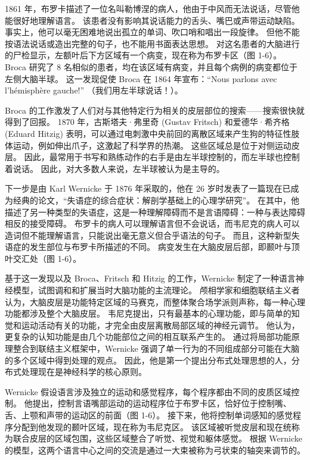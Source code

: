 1861 年，布罗卡描述了一位名叫勒博涅的病人，他由于中风而无法说话，尽管他能很好地理解语言。 该患者没有影响其说话能力的舌头、嘴巴或声带运动缺陷。 
事实上，他可以毫无困难地说出孤立的单词、吹口哨和唱出一段旋律。 
但他不能按语法说话或造出完整的句子，也不能用书面表达思想。 
对这名患者的大脑进行的尸检显示，左额叶后下方区域有一个病变，现在称为布罗卡区（图 1-6）。 
Broca 研究了 8 名相似的患者，均在该区域有病变，并且每个病例的病变都位于左侧大脑半球。 
这一发现促使 Broca 在 1864 年宣布：“Nous parlons avec l’hémisphère gauche!” （我们用左半球说话！）。


Broca 的工作激发了人们对与其他特定行为相关的皮层部位的搜索——搜索很快就得到了回报。 
1870 年，古斯塔夫·弗里奇 (Gustav Fritsch) 和爱德华·希齐格 (Eduard Hitzig) 表明，可以通过电刺激中央前回的离散区域来产生狗的特征性肢体运动，例如伸出爪子，这激起了科学界的热潮。 
这些区域总是位于对侧运动皮层。 
因此，最常用于书写和熟练动作的右手是由左半球控制的，而左半球也控制着说话。 
因此，对大多数人来说，左半球被认为是主导的。


下一步是由 Karl Wernicke 于 1876 年采取的，他在 26 岁时发表了一篇现在已成为经典的论文，“失语症的综合症状：解剖学基础上的心理学研究”。 
在其中，他描述了另一种类型的失语症，这是一种理解障碍而不是言语障碍：一种与表达障碍相反的接受障碍。 布罗卡的病人可以理解语言但不会说话，而韦尼克的病人可以造词但不能理解语言，只能说出毫无意义但合乎语法的句子。 
而且，这种新型失语症的发生部位与布罗卡所描述的不同。 
病变发生在大脑皮层后部，即颞叶与顶叶交汇处（图 1-6）。


基于这一发现以及 Broca、Fritsch 和 Hitzig 的工作，Wernicke 制定了一种语言神经模型，试图调和和扩展当时大脑功能的主流理论。 
颅相学家和细胞联结主义者认为，大脑皮层是功能特定区域的马赛克，而整体聚合场学派则声称，每一种心理功能都涉及整个大脑皮层。 
韦尼克提出，只有最基本的心理功能，即与简单的知觉和运动活动有关的功能，才完全由皮层离散局部区域的神经元调节。 
他认为，更复杂的认知功能是由几个功能部位之间的相互联系产生的。 
通过将局部功能原理整合到联结主义框架中，Wernicke 强调了单一行为的不同组成部分可能在大脑的多个区域中得到处理的观点。 
因此，他是第一个提出分布式处理思想的人，分布式处理现在是神经科学的核心原则。


Wernicke 假设语言涉及独立的运动和感觉程序，每个程序都由不同的皮质区域控制。 
他提出，控制言语嘴部运动的运动程序位于布罗卡区，恰好位于控制嘴、舌、上颚和声带的运动区的前面（图 1-6）。 
接下来，他将控制单词感知的感觉程序分配到他发现的颞叶区域，现在称为韦尼克区。 
该区域被听觉皮层和现在统称为联合皮层的区域包围，这些区域整合了听觉、视觉和躯体感觉。 
根据 Wernicke 的模型，这两个语言中心之间的交流是通过一大束被称为弓状束的轴突来调节的。


